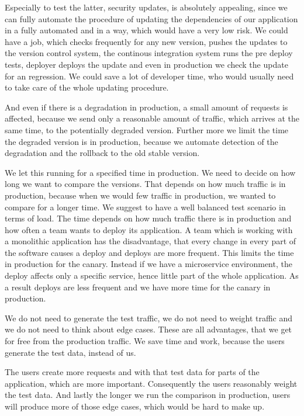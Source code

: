 Especially to test the latter, security updates, is absolutely appealing, since we can
fully automate the procedure of updating the dependencies of our application in a fully
automated and in a way, which would have a very low risk. We could have a job, which
checks frequently for any new version, pushes the updates to the version control system,
the continous integration system runs the pre deploy tests, deployer deploys the update
and even in production we check the update for an regression. We could save a lot of
developer time, who would usually need to take care of the whole updating procedure.

And even if there is a degradation in production, a small amount of requests is affected,
because we send only a reasonable amount of traffic, which arrives at the same time, to
the potentially degraded version. Further more we limit the time the degraded version is
in production, because we automate detection of the degradation and the rollback to the
old stable version.


We let this running for a specified time in production. We need to decide on how long we
want to compare the versions. That depends on how much traffic is in production, because
when we would few traffic in production, we wanted to compare for a longer time. We
suggest to have a well balanced test scenario in terms of load. The time depends on how
much traffic there is in production and how often a team wants to deploy its
application. A team which is working with a monolithic application has the disadvantage,
that every change in every part of the software causes a deploy and deploys are more
frequent. This limits the time in production for the canary. Instead if we have a
microservice environment, the deploy affects only a specific service, hence little part of
the whole application. As a result deploys are less frequent and we have more time for the
canary in production.

We do not need to generate the test traffic, we do not need to weight traffic and we do
not need to think about edge cases. These are all advantages, that we get for free from
the production traffic. We save time and work, because the users generate the test data,
instead of us.

The users create more requests and with that test data for parts of the application, which
are more important. Consequently the users reasonably weight the test data. And lastly the
longer we run the comparison in production, users will produce more of those edge cases,
which would be hard to make up.

